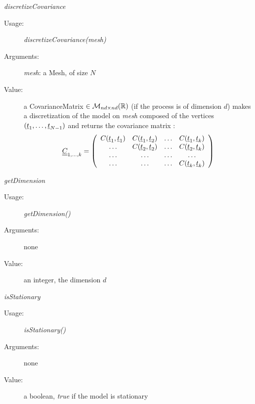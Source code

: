 \begin{description}
\begin{description}
\item \textit{discretizeCovariance}
\begin{description}
\item[Usage:] \textit{discretizeCovariance(mesh)}
\item[Arguments:] \textit{mesh}:  a Mesh,  of size $N$
\item[Value:] a CovarianceMatrix $\in{\mathcal M}_{nd\times nd}({\mathbb R})$ (if the process is of dimension $d$) makes a discretization of the model on  \textit{mesh} composed of the vertices $({\underline{t}}_1, \dots, {\underline{t}}_{N-1})$ and returns the covariance matrix  :
\begin{equation}\label{covMatrix}
{\underline{\underline{C}}}_{1,\dots,k} = \left(
\begin{array}{cccc}
C({\underline{t}}_1, {\underline{t}}_1) &C({\underline{t}}_1, {\underline{t}}_2) & \hdots & C({\underline{t}}_1, {\underline{t}}_{k}) \\
\hdots & C({\underline{t}}_2, {\underline{t}}_2)  & \hdots & C({\underline{t}}_2, {\underline{t}}_{k}) \\
\hdots & \hdots & \hdots & \hdots \\
\hdots & \hdots & \hdots & C({\underline{t}}_{k}, {\underline{t}}_{k})
\end{array}
\right)
\end{equation}

\end{description}
\bigskip

\item \textit{getDimension}
\begin{description}
\item[Usage:] \textit{getDimension()}
\item[Arguments:] none
\item[Value:]   an integer, the dimension  $d$
\end{description}
\bigskip

\item \textit{isStationary}
\begin{description}
\item[Usage:] \textit{isStationary()}
\item[Arguments:] none
\item[Value:] a boolean, \textit{true} if the model is stationary
\end{description}
\bigskip

\end{description}

\end{description}


\newpage
